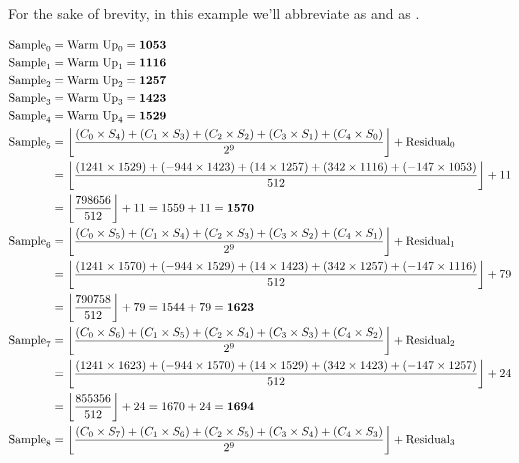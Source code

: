 For the sake of brevity, in this example we'll abbreviate
 as  and  as .

\clearpage
\begin{align*}
\SAMPLE_0 &= \WARMUP_0 = \textbf{1053} \\
\SAMPLE_1 &= \WARMUP_1 = \textbf{1116} \\
\SAMPLE_2 &= \WARMUP_2 = \textbf{1257} \\
\SAMPLE_3 &= \WARMUP_3 = \textbf{1423} \\
\SAMPLE_4 &= \WARMUP_4 = \textbf{1529} \\
\SAMPLE_5 &= \left\lfloor \frac{(\SCOEFF_0 \times \SSAMPLE_4) + (\SCOEFF_1 \times \SSAMPLE_3) + (\SCOEFF_2 \times \SSAMPLE_2) + (\SCOEFF_3 \times \SSAMPLE_1) + (\SCOEFF_4 \times \SSAMPLE_0)}{2 ^ 9}\right\rfloor + \RESIDUAL_0 \\
&= \left\lfloor \frac{(1241 \times 1529) + (-944 \times 1423) + (14 \times 1257) + (342 \times 1116) + (-147 \times 1053)}{512}\right\rfloor + 11 \\
&= \left\lfloor \frac{798656}{512} \right\rfloor + 11 = 1559 + 11 = \textbf{1570} \\
\SAMPLE_6 &= \left\lfloor \frac{(\SCOEFF_0 \times \SSAMPLE_5) + (\SCOEFF_1 \times \SSAMPLE_4) + (\SCOEFF_2 \times \SSAMPLE_3) + (\SCOEFF_3 \times \SSAMPLE_2) + (\SCOEFF_4 \times \SSAMPLE_1)}{2 ^ 9}\right\rfloor + \RESIDUAL_1 \\
&= \left\lfloor \frac{(1241 \times 1570) + (-944 \times 1529) + (14 \times 1423) + (342 \times 1257) + (-147 \times 1116)}{512}\right\rfloor + 79 \\
&= \left\lfloor \frac{790758}{512} \right\rfloor + 79 = 1544 + 79 = \textbf{1623} \\
\SAMPLE_7 &= \left\lfloor \frac{(\SCOEFF_0 \times \SSAMPLE_6) + (\SCOEFF_1 \times \SSAMPLE_5) + (\SCOEFF_2 \times \SSAMPLE_4) + (\SCOEFF_3 \times \SSAMPLE_3) + (\SCOEFF_4 \times \SSAMPLE_2)}{2 ^ 9}\right\rfloor + \RESIDUAL_2 \\
&= \left\lfloor \frac{(1241 \times 1623) + (-944 \times 1570) + (14 \times 1529) + (342 \times 1423) + (-147 \times 1257)}{512}\right\rfloor + 24 \\
&= \left\lfloor \frac{855356}{512} \right\rfloor + 24 = 1670 + 24 = \textbf{1694} \\
\SAMPLE_8 &= \left\lfloor \frac{(\SCOEFF_0 \times \SSAMPLE_7) + (\SCOEFF_1 \times \SSAMPLE_6) + (\SCOEFF_2 \times \SSAMPLE_5) + (\SCOEFF_3 \times \SSAMPLE_4) + (\SCOEFF_4 \times \SSAMPLE_3)}{2 ^ 9}\right\rfloor + \RESIDUAL_3 \\

\end{align*}
